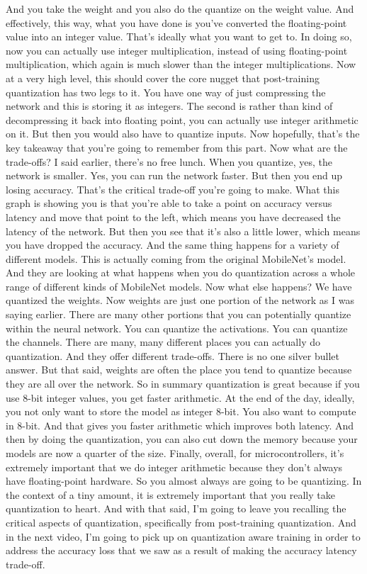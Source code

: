 And you take the weight and you also do the quantize on the weight value.
And effectively, this way, what you have done
is you've converted the floating-point value into an integer value.
That's ideally what you want to get to.
In doing so, now you can actually use integer multiplication,
instead of using floating-point multiplication,
which again is much slower than the integer multiplications.
Now at a very high level, this should cover the core nugget
that post-training quantization has two legs to it.
You have one way of just compressing the network
and this is storing it as integers.
The second is rather than kind of decompressing it back
into floating point, you can actually use integer arithmetic on it.
But then you would also have to quantize inputs.
Now hopefully, that's the key takeaway that you're
going to remember from this part.
Now what are the trade-offs?
I said earlier, there's no free lunch.
When you quantize, yes, the network is smaller.
Yes, you can run the network faster.
But then you end up losing accuracy.
That's the critical trade-off you're going to make.
What this graph is showing you is that you're
able to take a point on accuracy versus latency
and move that point to the left, which means you have
decreased the latency of the network.
But then you see that it's also a little lower, which
means you have dropped the accuracy.
And the same thing happens for a variety of different models.
This is actually coming from the original MobileNet's model.
And they are looking at what happens when
you do quantization across a whole range of different kinds of MobileNet models.
Now what else happens?
We have quantized the weights.
Now weights are just one portion of the network as I was saying earlier.
There are many other portions that you can potentially
quantize within the neural network.
You can quantize the activations.
You can quantize the channels.
There are many, many different places you can actually do quantization.
And they offer different trade-offs.
There is no one silver bullet answer.
But that said, weights are often the place
you tend to quantize because they are all over the network.
So in summary quantization is great because if you use 8-bit integer
values, you get faster arithmetic.
At the end of the day, ideally, you not only
want to store the model as integer 8-bit.
You also want to compute in 8-bit.
And that gives you faster arithmetic which improves both latency.
And then by doing the quantization, you can also
cut down the memory because your models are now a quarter of the size.
Finally, overall, for microcontrollers, it's
extremely important that we do integer arithmetic because they don't always
have floating-point hardware.
So you almost always are going to be quantizing.
In the context of a tiny amount, it is extremely important
that you really take quantization to heart.
And with that said, I'm going to leave you recalling
the critical aspects of quantization, specifically
from post-training quantization.
And in the next video, I'm going to pick up on quantization aware training
in order to address the accuracy loss that we saw as a result of making
the accuracy latency trade-off.

